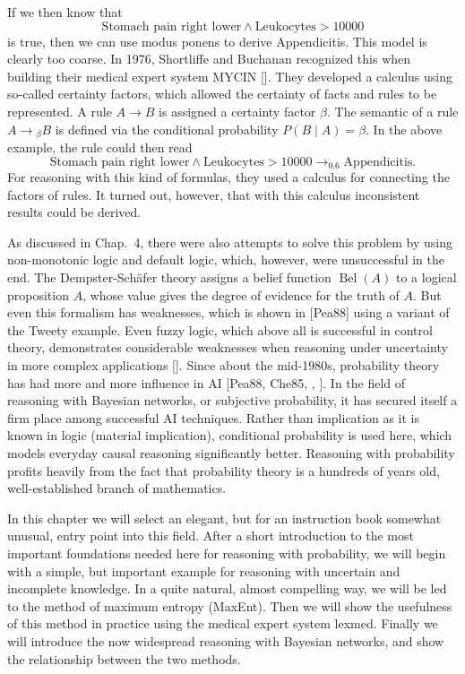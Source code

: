 \documentclass[10pt]{book}
\begin{document}
If we then know that
$$
\text{Stomach pain right lower} \wedge \text{Leukocytes} > 10000
$$
is true, then we can use modus ponens to derive Appendicitis. This model is clearly too coarse. In 1976, Shortliffe and Buchanan recognized this when building their medical expert system MYCIN [\cite{shortliffe1976mycin}]. They developed a calculus using so-called certainty factors, which allowed the certainty of facts and rules to be represented. A rule $A \rightarrow B$ is assigned a certainty factor $\beta$. The semantic of a rule $A \rightarrow{ }_{\beta} B$ is defined via the conditional probability $P(B \mid A)=\beta$. In the above example, the rule could then read
$$
\text{Stomach pain right lower} \wedge \text{Leukocytes} > 10000 \rightarrow_{0.6} \text{Appendicitis.}
$$
For reasoning with this kind of formulas, they used a calculus for connecting the factors of rules. It turned out, however, that with this calculus inconsistent results could be derived.

As discussed in Chap.~4, there were also attempts to solve this problem by using non-monotonic logic and default logic, which, however, were unsuccessful in the end. The Dempster-Schäfer theory assigns a belief function $\operatorname{Bel}(A)$ to a logical proposition $A$, whose value gives the degree of evidence for the truth of $A$. But even this formalism has weaknesses, which is shown in [Pea88] using a variant of the Tweety example. Even fuzzy logic, which above all is successful in control theory, demonstrates considerable weaknesses when reasoning under uncertainty in more complex applications [\cite{elkan1993fuzzy}].
Since about the mid-1980s, probability theory has had more and more influence in AI [Pea88, Che85, \cite{whittaker1996graphical}, \cite{jensen2001bayesian}]. In the field of reasoning with Bayesian networks, or subjective probability, it has secured itself a firm place among successful AI techniques. Rather than implication as it is known in logic (material implication), conditional probability is used here, which models everyday causal reasoning significantly better. Reasoning with probability profits heavily from the fact that probability theory is a hundreds of years old, well-established branch of mathematics.

In this chapter we will select an elegant, but for an instruction book somewhat unusual, entry point into this field. After a short introduction to the most important foundations needed here for reasoning with probability, we will begin with a simple, but important example for reasoning with uncertain and incomplete knowledge. In a quite natural, almost compelling way, we will be led to the method of maximum entropy (MaxEnt). Then we will show the usefulness of this method in practice using the medical expert system lexmed. Finally we will introduce the now widespread reasoning with Bayesian networks, and show the relationship between the two methods.
\end{document}
